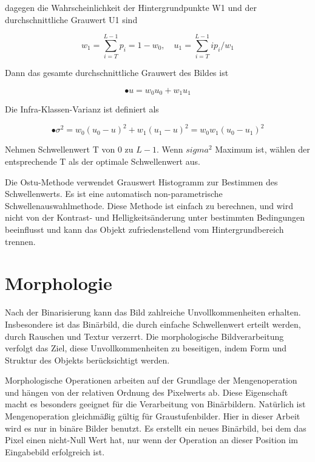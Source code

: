 dagegen die Wahrscheinlichkeit der Hintergrundpunkte W1 und der durchschnittliche Grauwert U1 sind

\begin{equation}
  w_{1} = \sum_{i=T}^{L-1} p_{i} = 1-w_{0},\quad u_{1} = \sum_{i=T}^{L-1} ip_{i}/w_{1}
\end{equation}

Dann das gesamte durchschnittliche Grauwert des Bildes ist

\begin{equation}
• u = w_{0}u_{0} + w_{1}u_{1}
\end{equation}

Die Infra-Klassen-Varianz ist definiert als

\begin{equation}
•\sigma^2 = w_{0}(u_{0} - u)^2 + w_{1}(u_{1} - u)^2 = w_{0}w_{1}(u_{0} - u_{1})^2
\end{equation}

Nehmen Schwellenwert T von 0 zu $ L-1 $. Wenn $ sigma^2 $ Maximum ist, wählen der entsprechende T als der optimale Schwellenwert aus.

Die Ostu-Methode verwendet Grauswert Histogramm zur Bestimmen des Schwellenwerts. Es ist eine automatisch non-parametrische Schwellenauswahlmethode. Diese Methode ist einfach zu berechnen, und wird nicht von der Kontrast- und Helligkeitsänderung unter bestimmten Bedingungen beeinflusst und kann das Objekt zufriedenstellend vom Hintergrundbereich trennen.

















\section{Morphologie}

Nach der Binarisierung kann das Bild zahlreiche Unvollkommenheiten erhalten. Insbesondere ist das Binärbild, die durch einfache Schwellenwert erteilt werden, durch Rauschen und Textur verzerrt. 
Die morphologische Bildverarbeitung verfolgt das Ziel, diese Unvollkommenheiten zu beseitigen, indem Form und Struktur des Objekts berücksichtigt werden.

Morphologische Operationen arbeiten auf der Grundlage der Mengenoperation und hängen von der relativen Ordnung des Pixelwerts ab. Diese Eigenschaft macht es besonders geeignet für die Verarbeitung von Binärbildern. Natürlich ist Mengenoperation gleichmäßig gültig für Graustufenbilder. Hier in dieser Arbeit wird es nur in binäre Bilder benutzt. Es erstellt ein neues Binärbild, bei dem das Pixel einen nicht-Null Wert hat, nur wenn der Operation an dieser Position im Eingabebild erfolgreich ist.

